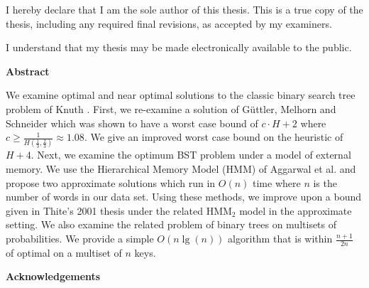 \cleardoublepage %
 


  \noindent
I hereby declare that I am the sole author of this thesis. This is a true copy of the thesis, including any required final revisions, as accepted by my examiners.

  \bigskip
  
  \noindent
I understand that my thesis may be made electronically available to the public.

\cleardoublepage


\begin{center}\textbf{Abstract}\end{center}

We examine optimal and near optimal solutions to the classic binary search tree problem of Knuth \cite{knuth1971optimum}. First, we re-examine a solution of G{\"u}ttler, Melhorn and Schneider \cite{guttler1980binary} which was shown to have a worst case bound of $c \cdot H + 2$ where $c \geq \frac{1}{H(\frac{1}{3},\frac{2}{3})} \approx 1.08$. We give an improved worst case bound on the heuristic of $H+4$. Next, we examine the optimum BST problem under a model of external memory. We use the Hierarchical Memory Model (HMM) of Aggarwal et al. \cite{aggarwal1987model} and propose two approximate solutions which run in $O(n)$ time where $n$ is the number of words in our data set. Using these methods, we improve upon a bound given in Thite's 2001 thesis \cite{thite2008optimum} under the related HMM$_2$ model in the approximate setting. We also examine the related problem of binary trees on multisets of probabilities. We provide a simple $O(n \lg(n))$ algorithm that is within $\frac{n+1}{2n}$ of optimal on a multiset of $n$ keys.

\cleardoublepage


\begin{center}\textbf{Acknowledgements}\end{center}

